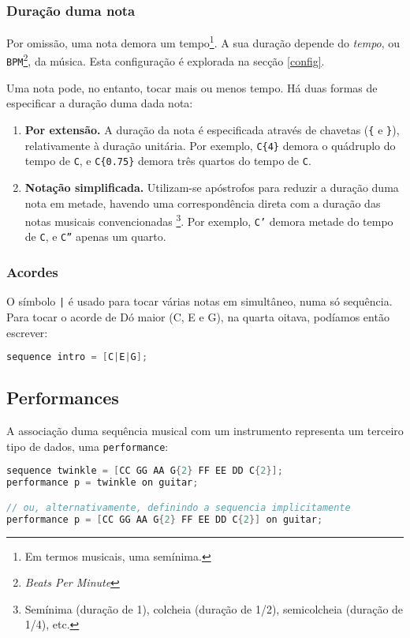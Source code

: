 \documentclass{article}
\begin{document}
\subsubsection{Duração duma nota}
Por omissão, uma nota demora um tempo\footnote{Em termos musicais, uma semínima.}. A sua duração depende do \textit{tempo}, ou \texttt{BPM}\footnote{\textit{Beats Per Minute}}, da música. Esta configuração é explorada na secção \ref{config}.

Uma nota pode, no entanto, tocar mais ou menos tempo. Há duas formas de especificar a duração duma dada nota:
\begin{enumerate}
    \item \textbf{Por extensão.} A duração da nota é especificada através de chavetas (\texttt{\{} e \texttt{\}}), relativamente à duração unitária. Por exemplo, \texttt{C\{4\}} demora o quádruplo do tempo de \texttt{C}, e \texttt{C\{0.75\}} demora três quartos do tempo de \texttt{C}.
    \item \textbf{Notação simplificada.} Utilizam-se apóstrofos para reduzir a duração duma nota em metade, havendo uma correspondência direta com a duração das notas musicais convencionadas
    \footnote{Semínima (duração de 1), colcheia (duração de 1/2), semicolcheia (duração de 1/4), etc.}. 
    Por exemplo, \texttt{C'} demora metade do tempo de \texttt{C}, e \texttt{C''} apenas um quarto. 
\end{enumerate}



\subsubsection{Acordes}
O símbolo \texttt{|} é usado para tocar várias notas em simultâneo, numa só sequência.
Para tocar o acorde de Dó maior (C, E e G), na quarta oitava, podíamos então escrever:
\begin{lstlisting}[language=C]
sequence intro = [C|E|G];
\end{lstlisting}

\subsection{Performances}
A associação duma sequência musical com um instrumento representa um terceiro tipo de dados, uma \texttt{performance}:
\begin{lstlisting}[language=C]
sequence twinkle = [CC GG AA G{2} FF EE DD C{2}];
performance p = twinkle on guitar;

// ou, alternativamente, definindo a sequencia implicitamente
performance p = [CC GG AA G{2} FF EE DD C{2}] on guitar;
\end{lstlisting}
\end{document}
